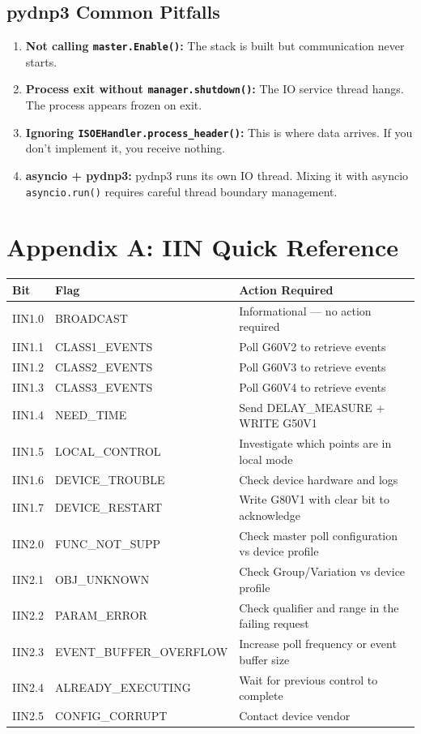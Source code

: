 \documentclass[11pt,twoside]{article}
\begin{document}
\subsection{pydnp3 Common Pitfalls}

\begin{enumerate}[noitemsep]
  \item \textbf{Not calling \texttt{master.Enable()}:} The stack is built but communication never starts.
  \item \textbf{Process exit without \texttt{manager.shutdown()}:} The IO service thread hangs. The process appears frozen on exit.
  \item \textbf{Ignoring \texttt{ISOEHandler.process\_header()}:} This is where data arrives. If you don't implement it, you receive nothing.
  \item \textbf{asyncio + pydnp3:} pydnp3 runs its own IO thread. Mixing it with asyncio \texttt{asyncio.run()} requires careful thread boundary management.
\end{enumerate}

\section*{Appendix A: IIN Quick Reference}

\begin{tabularx}{\textwidth}{llX}
\toprule
\textbf{Bit} & \textbf{Flag} & \textbf{Action Required} \\
\midrule
IIN1.0 & BROADCAST & Informational --- no action required \\
IIN1.1 & CLASS1\_EVENTS & Poll G60V2 to retrieve events \\
IIN1.2 & CLASS2\_EVENTS & Poll G60V3 to retrieve events \\
IIN1.3 & CLASS3\_EVENTS & Poll G60V4 to retrieve events \\
IIN1.4 & NEED\_TIME & Send DELAY\_MEASURE + WRITE G50V1 \\
IIN1.5 & LOCAL\_CONTROL & Investigate which points are in local mode \\
IIN1.6 & DEVICE\_TROUBLE & Check device hardware and logs \\
IIN1.7 & DEVICE\_RESTART & Write G80V1 with clear bit to acknowledge \\
IIN2.0 & FUNC\_NOT\_SUPP & Check master poll configuration vs device profile \\
IIN2.1 & OBJ\_UNKNOWN & Check Group/Variation vs device profile \\
IIN2.2 & PARAM\_ERROR & Check qualifier and range in the failing request \\
IIN2.3 & EVENT\_BUFFER\_OVERFLOW & Increase poll frequency or event buffer size \\
IIN2.4 & ALREADY\_EXECUTING & Wait for previous control to complete \\
IIN2.5 & CONFIG\_CORRUPT & Contact device vendor \\
\bottomrule
\end{tabularx}
\end{document}
